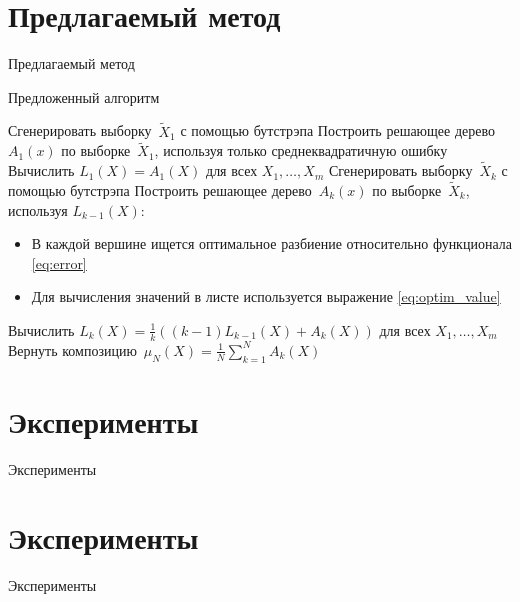 \documentclass[10pt,pdf,hyperref={unicode}]{beamer}
\begin{document}
\section{Предлагаемый метод}
\begin{frame}{Предлагаемый метод}
\begin{algorithm}[H]
\caption{Предложенный алгоритм}
    \begin{algorithmic}[1]
      \STATE Сгенерировать выборку~$\tilde X_1$ с помощью бутстрэпа
      \STATE Построить решающее дерево~$A_1(x)$ по выборке~$\tilde X_1$, используя только среднеквадратичную ошибку
      \STATE Вычислить $L_1(X) = A_1(X)$ для всех $X_1, \dots, X_m$
            \STATE Сгенерировать выборку~$\tilde X_k$ с помощью бутстрэпа
            \STATE Построить решающее дерево~$A_k(x)$ по выборке~$\tilde X_k$, используя $L_{k-1}(X)$:
                \begin{itemize}
                    \item В каждой вершине ищется оптимальное разбиение относительно функционала \eqref{eq:error}
                    \item Для вычисления значений в листе используется выражение \eqref{eq:optim_value}
                \end{itemize}
              
            \STATE Вычислить $L_{k}(X) = \frac{1}{k} ((k-1)L_{k-1}(X) + A_k(X))$ для всех $X_1, \dots, X_m$
        \ENDFOR
        \STATE Вернуть композицию~$\mu_N(X) = \frac{1}{N} \sum_{k = 1}^{N} A_k(X)$
    \end{algorithmic}
\end{algorithm}
\end{frame}

\section{Эксперименты}
\begin{frame}{Эксперименты}
\justifying
\begin{figure}[h]
  \centering
  
  
\end{figure}
\end{frame}

\section{Эксперименты}
\begin{frame}{Эксперименты}
\justifying
\begin{figure}[h]
  \centering
  
  
\end{figure}
\end{frame}
\end{document}
